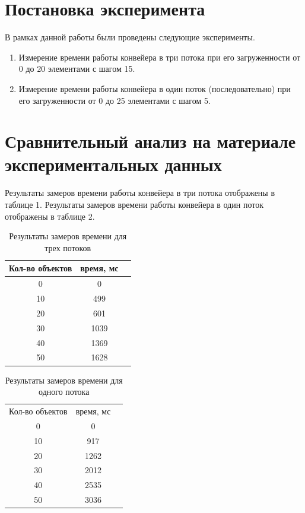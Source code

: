 \documentclass[a4paper,14pt]{report}
\begin{document}
\section*{Постановка эксперимента}

В рамках данной работы были проведены следующие эксперименты.

\begin{enumerate}
	\item Измерение времени работы конвейера в три потока при его загруженности от 0 до 20 элементами с шагом 15.
	\item Измерение времени работы конвейера в один поток (последовательно) при его загруженности от 0 до 25 элементами с шагом 5.
\end{enumerate}

\section*{Сравнительный анализ на материале экспериментальных данных}

Результаты замеров времени работы конвейера в три потока отображены в таблице 1. Результаты замеров времени работы конвейера в один поток отображены в таблице 2.

\begin{table}
	\caption{Результаты замеров времени для трех потоков}
	\begin{center}
	\tabcolsep=0.11cm
		\begin{tabular}{|c | c | c |}
	 	\hline
		Кол-во объектов & время, мс  \\ [0.5ex]
	 	\hline\hline
		0 & 0 \\ \hline
		10 & 499 \\ \hline
		20 & 601 \\ \hline
		30 & 1039 \\ \hline
		40 & 1369 \\ \hline
		50 & 1628 \\ \hline
	\end{tabular}
	\end{center}
\end{table}

\begin{table}
	\caption{Результаты замеров времени для одного потока}
	\begin{center}
	\tabcolsep=0.11cm
		\begin{tabular}{|c | c | c |}
	 	\hline
		Кол-во объектов & время, мс  \\ [0.5ex]
		0 & 0 \\ \hline
		10 & 917 \\ \hline
		20 & 1262 \\ \hline
		30 & 2012 \\ \hline
		40 & 2535 \\ \hline
		50 & 3036 \\ \hline
	\end{tabular}
	\end{center}
\end{table}
\end{document}
